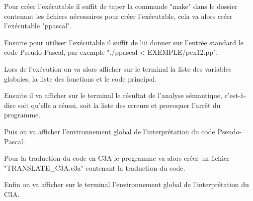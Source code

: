 \documentclass{report}
\begin{document}
Pour créer l'exécutable il suffit de taper la commande "make" dans le dossier contenant les fichiers nécessaires pour créer l'exécutable, cela va alors créer l'exécutable "ppascal".

Ensuite pour utiliser l'exécutable il suffit de lui donner sur l'entrée standard le code Pseudo-Pascal, par exemple "./ppascal < EXEMPLE/pex12.pp".

Lors de l'exécution on va alors afficher sur le terminal la liste des variables globales, la liste des fonctions et le code principal.

Ensuite il va afficher sur le terminal le résultat de l'analyse sémantique, c'est-à-dire soit qu'elle a réussi, soit la liste des erreurs et provoquer l'arrêt du programme.

Puis on va afficher l'environnement global de l'interprétation du code Pseudo-Pascal.

Pour la traduction du code en C3A le programme va alors créer un fichier "TRANSLATE\_C3A.c3a" contenant la traduction du code.

Enfin on va afficher sur le terminal l'environnement global de l'interprétation du C3A.
\end{document}

